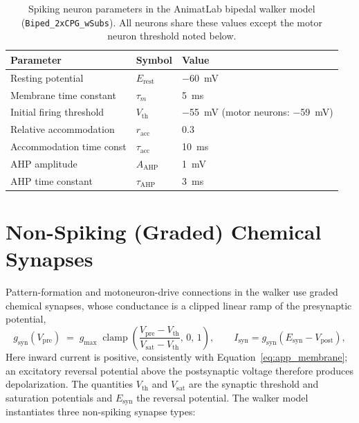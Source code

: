 \begin{table}[htbp]
\caption{Spiking neuron parameters in the AnimatLab bipedal walker model
(\nolinkurl{Biped_2xCPG_wSubs}). All neurons share these values except the motor
neuron threshold noted below.}
\label{tab:app_neuron}
\small\begin{tabularx}{\textwidth}{@{}>{\raggedright\arraybackslash}p{}lL@{}}
\toprule
\textbf{Parameter} & \textbf{Symbol} & \textbf{Value} \\
\midrule
Resting potential        & $E_{\text{rest}}$   & \qty{-60}{\mV} \\
Membrane time constant   & $\tau_{m}$          & \qty{5}{\ms}   \\
Initial firing threshold & $V_{\text{th}}$     & \qty{-55}{\mV} (motor neurons: \qty{-59}{\mV}) \\
Relative accommodation   & $r_{\text{acc}}$    & 0.3            \\
Accommodation time const & $\tau_{\text{acc}}$ & \qty{10}{\ms}  \\
AHP amplitude            & $A_{\text{AHP}}$    & \qty{1}{\mV}   \\
AHP time constant        & $\tau_{\text{AHP}}$ & \qty{3}{\ms}   \\
\bottomrule
\end{tabularx}
\end{table}

\section{Non-Spiking (Graded) Chemical Synapses}

Pattern-formation and motoneuron-drive connections in the walker use graded chemical synapses, whose conductance is a clipped linear ramp of the presynaptic potential,
\begin{equation}
    g_{\text{syn}}(V_{\text{pre}})
    \;=\; g_{\text{max}}\;
    \operatorname{clamp}\!\left(
        \frac{V_{\text{pre}} - V_{\text{th}}}{V_{\text{sat}} - V_{\text{th}}},
        \,0,\,1\right),
    \qquad
    I_{\text{syn}} = g_{\text{syn}}\left(E_{\text{syn}} - V_{\text{post}}\right),
    \label{eq:app_nonsyn}
\end{equation}
Here inward current is positive, consistently with Equation~\eqref{eq:app_membrane}; an excitatory reversal potential above the postsynaptic voltage therefore produces depolarization. The quantities $V_{\text{th}}$ and $V_{\text{sat}}$ are the synaptic threshold and saturation potentials and $E_{\text{syn}}$ the reversal potential. The walker model instantiates three non-spiking synapse types:

